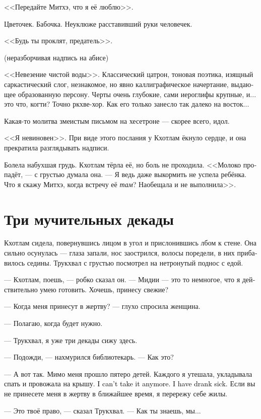\documentclass[a4paper,12pt,fleqn]{book}\usepackage{cooltooltips}\usepackage{polyglossia}\setdefaultlanguage[babelshorthands=true]{russian}\setotherlanguage{english}\defaultfontfeatures{Ligatures=TeX,Mapping=tex-text} \usepackage{xcolor}\definecolor{lightgray}{HTML}{bbbbbb}\color{lightgray}\newcommand{\ml}[3]{\textenglish{\textcolor{black}{#3}} }
\begin{document}
<<Передайте Митхэ, что я её люблю>>.

Цветочек.
Бабочка.
Неуклюже расставивший руки человечек.

<<Будь ты проклят, предатель>>.

(неразборчивая надпись на абисе)

<<Невезение чистой воды>>.
Классический цатрон, тоновая поэтика, изящный саркастический слог, незнакомое, но явно каллиграфическое начертание, выдающее образованную персону.
Черты очень глубокие, сами иероглифы крупные, и... это что, когти?
Точно ркхве-хор.
Как его только занесло так далеко на восток...

Какая-то молитва змеистым письмом на хесетроне --- скорее всего, идол.

<<Я невиновен>>.
При виде этого послания у Кхотлам ёкнуло сердце, и она прекратила разглядывать надписи.

Болела набухшая грудь.
Кхотлам тёрла её, но боль не проходила.
<<Молоко пропадёт, --- с грустью думала она.
--- Я ведь даже выкормить не успела ребёнка.
Что я скажу Митхэ, когда встречу её \emph{там}?
Наобещала и не выполнила>>.

\section{Три мучительных декады}

Кхотлам сидела, повернувшись лицом в угол и прислонившись лбом к стене.
Она сильно осунулась --- глаза запали, нос заострился, волосы поредели, в них прибавилось седины.
Трукхвал с грустью посмотрел на нетронутый поднос с едой.

--- Кхотлам, поешь, --- робко сказал он.
--- Мидии --- это то немногое, что я действительно умею готовить.
Хочешь, принесу свежие?

--- Когда меня принесут в жертву? --- глухо спросила женщина.

--- Полагаю, когда будет нужно.

--- Трукхвал, я уже три декады сижу здесь.

--- Подожди, --- нахмурился библиотекарь.
--- Как это?

--- А вот так.
Мимо меня прошло пятеро детей.
Каждого я утешала, укладывала спать и провожала на крышу.
\ml{$0$}
{Я больше так не могу.}
{I can't take it anymore.}
\ml{$0$}
{С меня хватит.}
{I have drank sick.}
Если вы не принесете меня в жертву в ближайшее время, я перережу себе жилы.

--- Это твоё право, --- сказал Трукхвал.
--- Как ты знаешь, мы...
\end{document}
